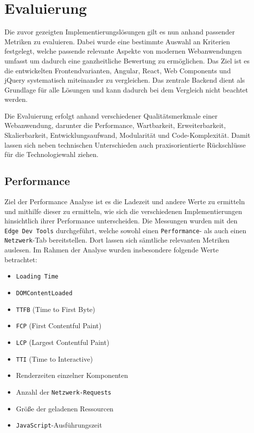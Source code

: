 \documentclass[oneside]{ausarbeitung}
\begin{document}
\chapter{Evaluierung}

Die zuvor gezeigten Implementierungslösungen gilt es nun anhand passender Metriken zu evaluieren. Dabei wurde eine bestimmte Auswahl an Kriterien festgelegt, welche passende relevante Aspekte von modernen Webanwendungen umfasst um dadurch eine ganzheitliche Bewertung zu ermöglichen. Das Ziel ist es die entwickelten Frontendvarianten, Angular, React, Web Components und jQuery systematisch miteinander zu vergleichen. Das zentrale Backend dient als Grundlage für alle Lösungen und kann dadurch bei dem Vergleich nicht beachtet werden. 

Die Evaluierung erfolgt anhand verschiedener Qualitätsmerkmale einer Webanwendung, darunter die Performance, Wartbarkeit, Erweiterbarkeit, Skalierbarkeit, Entwicklungsaufwand, Modularität und Code-Komplexität. Damit lassen sich neben technischen Unterschieden auch praxisorientierte Rückschlüsse für die Technologiewahl ziehen. 

\section{Performance}
Ziel der Performance Analyse ist es die Ladezeit und andere Werte zu ermitteln und mithilfe dieser zu ermitteln, wie sich die verschiedenen Implementierungen hinsichtlich ihrer Performance unterscheiden.
Die Messungen wurden mit den \texttt{Edge Dev Tools} durchgeführt, welche sowohl einen \texttt{Performance}- als auch einen \texttt{Netzwerk}-Tab bereitstellen. Dort lassen sich sämtliche relevanten Metriken auslesen. Im Rahmen der Analyse wurden insbesondere folgende Werte betrachtet:
\begin{itemize}
  \item \texttt{Loading Time}
  \item \texttt{DOMContentLoaded}
  \item \texttt{TTFB} (Time to First Byte)
  \item \texttt{FCP} (First Contentful Paint)
  \item \texttt{LCP} (Largest Contentful Paint)
  \item \texttt{TTI} (Time to Interactive)
  \item Renderzeiten einzelner Komponenten
  \item Anzahl der \texttt{Netzwerk-Requests}
  \item Größe der geladenen Ressourcen
  \item \texttt{JavaScript}-Ausführungszeit
\end{itemize}
\end{document}
